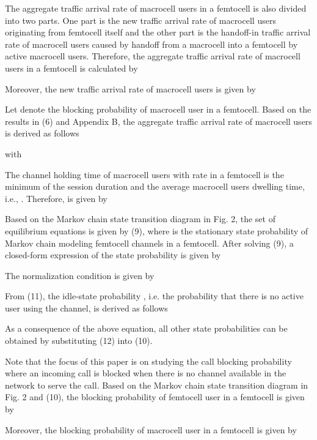 \documentclass[10pt,final,journal,letterpaper,twoside,twocolumn]{IEEEtran}
\begin{document}
The aggregate traffic arrival rate of macrocell users  in a femtocell is also divided into two parts. One part is the new traffic arrival rate of macrocell users  originating from femtocell itself and the other part is the handoff-in traffic arrival rate of macrocell users  caused by handoff from a macrocell into a femtocell by active
macrocell users. Therefore, the aggregate traffic arrival rate of macrocell users  in a
femtocell is calculated by


Moreover, the new traffic arrival rate of macrocell users  is given by


Let  denote the blocking probability of macrocell user in a
femtocell. Based on the results in (6) and Appendix B, the aggregate traffic arrival
rate of macrocell users  is derived as follows

with




The channel holding time of macrocell users  with rate  in a femtocell is the minimum of the session duration and the average macrocell users dwelling time, i.e., . Therefore,  is given by \cite{Shun05}


\begin{figure*}[!t]




\end{figure*}

Based on the Markov chain state transition diagram in Fig. 2, the set of equilibrium
equations is given by (9), where  is the stationary state probability of Markov chain modeling femtocell channels in a femtocell. After
solving (9), a closed-form expression of the state probability  is given by


The normalization condition is given by


From (11), the idle-state probability , i.e. the probability that there is no active user using the channel, is derived as follows


As a consequence of the above equation, all other state probabilities can be obtained by
substituting (12) into (10).


Note that the focus of this paper is on studying the call blocking probability where an incoming call is blocked when there is no channel available in the network to serve the call. Based on the Markov chain state transition diagram in Fig. 2 and (10), the blocking probability of femtocell user in a femtocell is given by


Moreover, the blocking probability of macrocell user in a femtocell is given by
\end{document}
